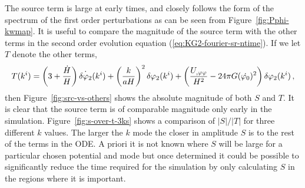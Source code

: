 The source term is large at early times, and closely follows the form
of the spectrum of the first order perturbations as can be seen from
Figure~\ref{fig:Pphi-kwmap}.
%
It is useful to compare the magnitude of the source term with the
other terms in the second order evolution equation
(\ref{eq:KG2-fourier-sr-ntime}). If we let $T$ denote the other terms,
%
\begin{equation}
\label{eq:Tdefn}
 T(k^i) = \left(3 + \frac{\dot{H}}{H}\right)
\dot{\delta\varphi_{2}}(k^i)+ \left(\frac{k}{aH}\right)^2\delta\varphi_{2}(k^i)
+\left(\frac{U_{,\varphi\varphi}}{H^2}-{24 \pi G}(\dot{\varphi_{0}})^2\right)
\delta\varphi_{2}(k^i) \,,
\end{equation}
%
then Figure~\ref{fig:src-vs-others} shows the absolute magnitude of
both $S$ and $T$.  It is clear that the source term is of comparable
magnitude only early in the simulation.  Figure~\ref{fig:s-over-t-3ks}
shows a comparison of $|S|/|T|$ for three different $k$ values. The larger the $k$ mode the closer
in amplitude $S$ is to the rest of the terms in the ODE.
A priori it is not known
where $S$ will be large for a particular chosen potential and mode but
once determined it could be possible to significantly reduce the time required
for the simulation by only calculating $S$ in the regions where it is
important.
%
